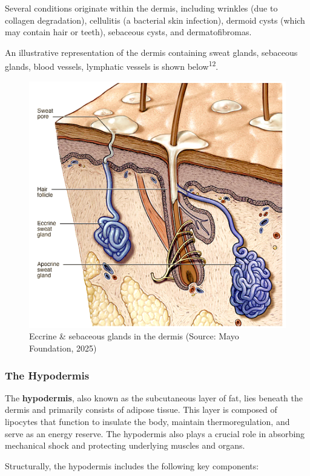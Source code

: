 \documentclass[
]{article}
\begin{document}
Several conditions originate within the dermis, including wrinkles (due
to collagen degradation), cellulitis (a bacterial skin infection),
dermoid cysts (which may contain hair or teeth), sebaceous cysts, and
dermatofibromas.

An illustrative representation of the dermis containing sweat glands,
sebaceous glands, blood vessels, lymphatic vessels is shown
below\textsuperscript{12}.

\begin{figure}

\hfill{}\includegraphics[width=0.8\linewidth]{Images/Glands} 

\caption{Eccrine \& sebaceous glands in the dermis (Source: Mayo Foundation, 2025)}\label{fig:unnamed-chunk-10}
\end{figure}

\subsubsection{The Hypodermis}\label{the-hypodermis}

The \textbf{hypodermis}, also known as the subcutaneous layer of fat,
lies beneath the dermis and primarily consists of adipose tissue. This
layer is composed of lipocytes that function to insulate the body,
maintain thermoregulation, and serve as an energy reserve. The
hypodermis also plays a crucial role in absorbing mechanical shock and
protecting underlying muscles and organs.

Structurally, the hypodermis includes the following key components:
\end{document}
